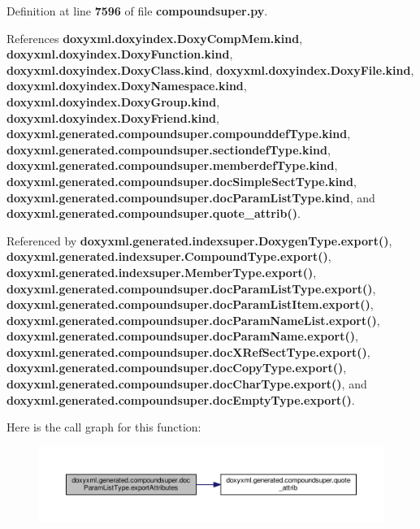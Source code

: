 Definition at line {\bf 7596} of file {\bf compoundsuper.\+py}.



References {\bf doxyxml.\+doxyindex.\+Doxy\+Comp\+Mem.\+kind}, {\bf doxyxml.\+doxyindex.\+Doxy\+Function.\+kind}, {\bf doxyxml.\+doxyindex.\+Doxy\+Class.\+kind}, {\bf doxyxml.\+doxyindex.\+Doxy\+File.\+kind}, {\bf doxyxml.\+doxyindex.\+Doxy\+Namespace.\+kind}, {\bf doxyxml.\+doxyindex.\+Doxy\+Group.\+kind}, {\bf doxyxml.\+doxyindex.\+Doxy\+Friend.\+kind}, {\bf doxyxml.\+generated.\+compoundsuper.\+compounddef\+Type.\+kind}, {\bf doxyxml.\+generated.\+compoundsuper.\+sectiondef\+Type.\+kind}, {\bf doxyxml.\+generated.\+compoundsuper.\+memberdef\+Type.\+kind}, {\bf doxyxml.\+generated.\+compoundsuper.\+doc\+Simple\+Sect\+Type.\+kind}, {\bf doxyxml.\+generated.\+compoundsuper.\+doc\+Param\+List\+Type.\+kind}, and {\bf doxyxml.\+generated.\+compoundsuper.\+quote\+\_\+attrib()}.



Referenced by {\bf doxyxml.\+generated.\+indexsuper.\+Doxygen\+Type.\+export()}, {\bf doxyxml.\+generated.\+indexsuper.\+Compound\+Type.\+export()}, {\bf doxyxml.\+generated.\+indexsuper.\+Member\+Type.\+export()}, {\bf doxyxml.\+generated.\+compoundsuper.\+doc\+Param\+List\+Type.\+export()}, {\bf doxyxml.\+generated.\+compoundsuper.\+doc\+Param\+List\+Item.\+export()}, {\bf doxyxml.\+generated.\+compoundsuper.\+doc\+Param\+Name\+List.\+export()}, {\bf doxyxml.\+generated.\+compoundsuper.\+doc\+Param\+Name.\+export()}, {\bf doxyxml.\+generated.\+compoundsuper.\+doc\+X\+Ref\+Sect\+Type.\+export()}, {\bf doxyxml.\+generated.\+compoundsuper.\+doc\+Copy\+Type.\+export()}, {\bf doxyxml.\+generated.\+compoundsuper.\+doc\+Char\+Type.\+export()}, and {\bf doxyxml.\+generated.\+compoundsuper.\+doc\+Empty\+Type.\+export()}.



Here is the call graph for this function\+:
\nopagebreak
\begin{figure}[H]
\begin{center}
\leavevmode
\includegraphics[width=350pt]{d2/d0c/classdoxyxml_1_1generated_1_1compoundsuper_1_1docParamListType_a3ae4bd9d315a4f29679622a7cb4eddab_cgraph}
\end{center}
\end{figure}




